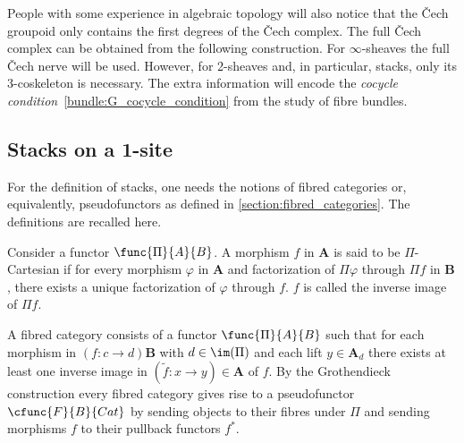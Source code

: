     People with some experience in algebraic topology will also notice that the \v{C}ech groupoid only contains the first degrees of the \v{C}ech complex. The full \v{C}ech complex can be obtained from the following construction.
    For $\infty$-sheaves the full \v{C}ech nerve will be used. However, for 2-sheaves and, in particular, stacks, only its 3-coskeleton is necessary. The extra information will encode the \textit{cocycle condition}~\eqref{bundle:G_cocycle_condition} from the study of fibre bundles.

\subsection{Stacks on a 1-site}

    For the definition of stacks, one needs the notions of fibred categories or, equivalently, pseudofunctors as defined in \cref{section:fibred_categories}. The definitions are recalled here.
    \begin{mdframed}[roundcorner=10pt, linecolor=green, linewidth=1pt]
        Consider a functor $\func{\Pi}{A}{B}$. A morphism $f$ in $\mathbf{A}$ is said to be $\Pi$-Cartesian if for every morphism $\varphi$ in $\mathbf{A}$ and factorization of $\Pi\varphi$ through $\Pi f$ in $\mathbf{B}$, there exists a unique factorization of $\varphi$ through $f$. $f$ is called the inverse image of $\Pi f$.

        A fibred category consists of a functor $\func{\Pi}{A}{B}$ such that for each morphism in $(f:c\rightarrow d)\mathbf{B}$ with $d\in\im(\Pi)$ and each lift $y\in\mathbf{A}_d$ there exists at least one inverse image in $(\widetilde{f}:x\rightarrow y)\in\mathbf{A}$ of $f$. By the Grothendieck construction every fibred category gives rise to a pseudofunctor $\cfunc{F}{B}{Cat}$ by sending objects to their fibres under $\Pi$ and sending morphisms $f$ to their pullback functors $f^*$.
    \end{mdframed}

